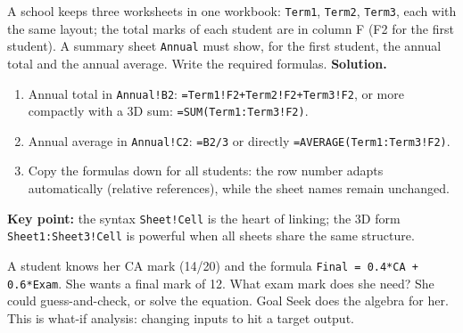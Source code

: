\documentclass[11pt]{article}
\newcommand{\cle}[1]{{\popxbold\color{popdark}#1}}
\newcounter{popsec}
\newcounter{popsub}
\newcommand{\courssub}[1]{%
  \stepcounter{popsub}%
  \par\vspace{9pt}\noindent{\popxbold\fontsize{11.5}{13}\selectfont\color{popink}{\color{poporange}\thepopsec.\thepopsub}\hspace{6pt}#1}\par\nopagebreak\vspace{4pt}
}
\begin{document}
\begin{exoresolu}
A school keeps three worksheets in one workbook: \texttt{Term1}, \texttt{Term2}, \texttt{Term3}, each with the same layout; the total marks of each student are in column F (F2 for the first student). A summary sheet \texttt{Annual} must show, for the first student, the annual total and the annual average. Write the required formulas.
\tcblower
\textbf{Solution.}
\begin{enumerate}
\item Annual total in \texttt{Annual!B2}: \texttt{=Term1!F2+Term2!F2+Term3!F2}, or more compactly with a 3D sum: \texttt{=SUM(Term1:Term3!F2)}.
\item Annual average in \texttt{Annual!C2}: \texttt{=B2/3} or directly \texttt{=AVERAGE(Term1:Term3!F2)}.
\item Copy the formulas down for all students: the row number adapts automatically (relative references), while the sheet names remain unchanged.
\end{enumerate}
\textbf{Key point:} the syntax \texttt{Sheet!Cell} is the heart of linking; the 3D form \texttt{Sheet1:Sheet3!Cell} is powerful when all sheets share the same structure.
\end{exoresolu}

\courssub{What-If Analysis}

\begin{experience}
A student knows her CA mark (14/20) and the formula \texttt{Final = 0.4*CA + 0.6*Exam}. She wants a final mark of 12. What exam mark does she need? She could guess-and-check, or solve the equation. \cle{Goal Seek} does the algebra for her. This is \cle{what-if analysis}: changing inputs to hit a target output.
\end{experience}
\end{document}
